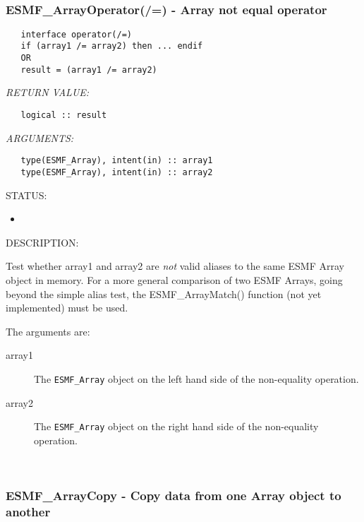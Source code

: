  
\mbox{}\hrulefill\ 
 
\subsubsection [ESMF\_ArrayOperator(/=)] {ESMF\_ArrayOperator(/=) - Array not equal operator}


  
\begin{verbatim}   interface operator(/=)
   if (array1 /= array2) then ... endif
   OR
   result = (array1 /= array2)\end{verbatim}{\em RETURN VALUE:}
\begin{verbatim}   logical :: result\end{verbatim}{\em ARGUMENTS:}
\begin{verbatim}   type(ESMF_Array), intent(in) :: array1
   type(ESMF_Array), intent(in) :: array2\end{verbatim}
{\sf STATUS:}
   \begin{itemize}
   \item{}
   \end{itemize}
  
{\sf DESCRIPTION:\\ }


   Test whether array1 and array2 are {\it not} valid aliases to the
   same ESMF Array object in memory. For a more general comparison of two ESMF
   Arrays, going beyond the simple alias test, the ESMF\_ArrayMatch() function
   (not yet implemented) must be used.
  
   The arguments are:
   \begin{description}
   \item[array1]
   The {\tt ESMF\_Array} object on the left hand side of the non-equality
   operation.
   \item[array2]
   The {\tt ESMF\_Array} object on the right hand side of the non-equality
   operation.
   \end{description}
   
 
\mbox{}\hrulefill\ 
 
\subsubsection [ESMF\_ArrayCopy] {ESMF\_ArrayCopy - Copy data from one Array object to another}


